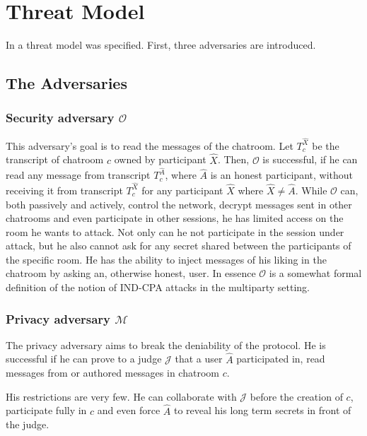 \chapter{Threat Model}
\label{chapters:ThreatModel}

\newcommand{\secadv}{$\mathcal{O}$}
\newcommand{\privadv}{$\mathcal{M}$}

In \cite{mpotr} a threat model was specified. First, three adversaries are introduced.

\section{The Adversaries}

\subsection{Security adversary $\mathcal{O}$}
This adversary's goal is to read the messages of the chatroom.
Let $T_c^{\hat{X}}$ be the transcript of chatroom $c$ owned by participant $\hat{X}$.
Then, $\mathcal{O}$ is successful, if he can read any message from transcript $T_c^{\hat{A}}$, where $\hat{A}$ is an honest participant, without receiving it from transcript $T_c^{\hat{X}}$ for any participant $\hat{X}$ where $\hat{X} \ne \hat{A}$.
While $\mathcal{O}$ can, both passively and actively, control the network, decrypt messages sent in other chatrooms and even participate in other sessions, he has limited access on the room he wants to attack.
Not only can he not participate in the session under attack, but he also cannot ask for any secret shared between the participants of the specific room.
He has the ability to inject messages of his liking in the chatroom by asking an, otherwise honest, user.
In essence $\mathcal{O}$ is a somewhat formal definition of the notion of IND-CPA attacks in the multiparty setting.

\subsection{Privacy adversary $\mathcal{M}$}

The privacy adversary aims to break the deniability of the protocol.
He is successful if he can prove to a judge $\mathcal{J}$ that a user $\hat{A}$ participated in, read messages from or authored messages in chatroom $c$.

His restrictions are very few.
He can collaborate with $\mathcal{J}$ before the creation of $c$, participate fully in $c$ and even force $\hat{A}$ to reveal his long term secrets in front of the judge.


